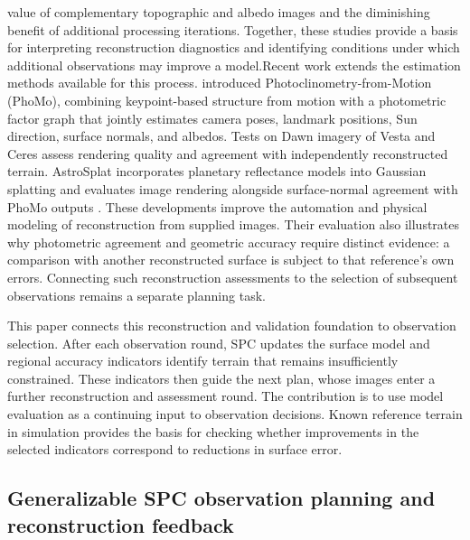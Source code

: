 value of complementary topographic and albedo images and the diminishing benefit of additional processing iterations. Together, these studies provide a basis for interpreting reconstruction diagnostics and identifying conditions under which additional observations may improve a model.Recent work extends the estimation methods available for this process. \citet{driver2025} introduced Photoclinometry-from-Motion (PhoMo), combining keypoint-based structure from motion with a photometric factor graph that jointly estimates camera poses, landmark positions, Sun direction, surface normals, and albedos. Tests on Dawn imagery of Vesta and Ceres assess rendering quality and agreement with independently reconstructed terrain. AstroSplat incorporates planetary reflectance models into Gaussian splatting and evaluates image rendering alongside surface-normal agreement with PhoMo outputs \citep{nolan2026astrosplat}. These developments improve the automation and physical modeling of reconstruction from supplied images. Their evaluation also illustrates why photometric agreement and geometric accuracy require distinct evidence: a comparison with another reconstructed surface is subject to that reference's own errors. Connecting such reconstruction assessments to the selection of subsequent observations remains a separate planning task.

This paper connects this reconstruction and validation foundation to observation selection. After each observation round, SPC updates the surface model and regional accuracy indicators identify terrain that remains insufficiently constrained. These indicators then guide the next plan, whose images enter a further reconstruction and assessment round. The contribution is to use model evaluation as a continuing input to observation decisions. Known reference terrain in simulation provides the basis for checking whether improvements in the selected indicators correspond to reductions in surface error.

\subsection{Generalizable SPC observation planning and reconstruction feedback}
\label{subsec:spc-observation-planning}


